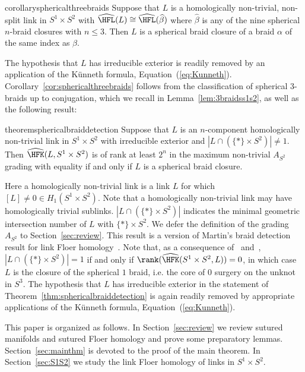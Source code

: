 \documentclass{amsart}
\theoremstyle{definition}
\theoremstyle{remark}
\numberwithin{equation}{section}
\begin{document}
\begin{restatable}{corollary}{sphericalthreebraids}\label{cor:sphericalthreebraids}
     Suppose that $L$ is a homologically non-trivial, non-split link in $S^1\times S^2$ with ${\widehat{\HFL}(L)\cong\widehat{\HFL}(\widehat{\beta})}$ where $\widehat{\beta}$ is any of the nine spherical $n$-braid closures with $n\leq 3$. Then $L$ is a spherical braid closure of a braid $\alpha$ of the same index as $\beta$.
\end{restatable}

The hypothesis that $L$ has irreducible exterior is readily removed by an application of the K\"unneth formula, Equation~(\ref{eq:Kunneth}). Corollary~\ref{cor:sphericalthreebraids} follows from the classification of spherical $3$-braids up to conjugation, which we recall in Lemma~\ref{lem:3braidss1s2}, as well as the following result:

\begin{restatable}{theorem}{sphericalbraiddetection}\label{thm:sphericalbraiddetection}
     Suppose that $L$ is an $n$-component homologically non-trivial link in $S^1\times S^2$ with irreducible exterior and $|L\cap (\{*\}\times S^2)|\neq 1$. Then $\widehat{\HFK}(L,S^1\times S^2)$ is of rank at least $2^n$ in the maximum non-trivial $A_{S^2}$ grading with equality if and only if $L$ is a spherical braid closure.
 \end{restatable}


Here a homologically non-trivial link is a link $L$ for which $[L]\neq 0\in H_1(S^1\times S^2)$. Note that a homologically non-trivial link may have homologically trivial sublinks. $|L\cap (\{*\}\times S^2)|$ indicates the minimal geometric intersection number of $L$ with $\{*\}\times S^2$. We defer the definition of the grading $A_{S^2}$ to Section~\ref{sec:review}. This result is a version of Martin’s braid detection result for link Floer homology~\cite[Proposition
1.1]{martin2022khovanov}. Note that, as a consequence of~\cite[Proposition 9.18]{juhasz2006holomorphic} and~\cite[Theorem 1.4]{juhasz2008floer}, $|L\cap (\{*\}\times S^2)|=1$ if and only if $\rank(\widehat{\HFK}(S^1\times S^2,L))=0$, in which case $L$ is the closure of the spherical $1$ braid, i.e. the core of $0$ surgery on the unknot in $S^3$. The hypothesis that $L$ has irreducible exterior in the statement of Theorem~\ref{thm:sphericalbraiddetection} is again readily removed by appropriate applications of the K\"unneth formula, Equation~(\ref{eq:Kunneth}).

 This paper is organized as follows. In Section~\ref{sec:review} we review sutured manifolds and sutured Floer homology and prove some preparatory lemmas. Section~\ref{sec:mainthm} is devoted to the proof of the main theorem. In Section~\ref{sec:S1S2} we study the link Floer homology of links in $S^1\times S^2$. 
\end{document}
